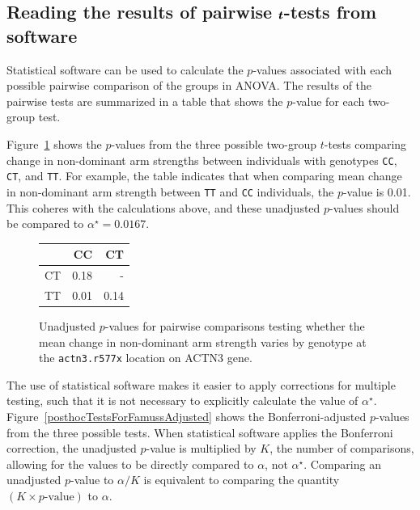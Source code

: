 

\textD{\newpage}


\subsection{Reading the results of pairwise $\pmb{\MakeLowercase{t}}$-tests from software}

Statistical software can be used to calculate the $p$-values associated with each possible pairwise comparison of the groups in ANOVA. The results of the pairwise tests are summarized in a table that shows the $p$-value for each two-group test. 

Figure~\ref{posthocTestsForFamussUnadjusted} shows the $p$-values from the three possible two-group $t$-tests comparing change in non-dominant arm strengths between individuals with genotypes \texttt{CC}, \texttt{CT}, and \texttt{TT}. For example, the table indicates that when comparing mean change in non-dominant arm strength between \texttt{TT} and \texttt{CC} individuals, the $p$-value is 0.01. This coheres with the calculations above, and these unadjusted $p$-values should be compared to $\alpha^\star = 0.0167$.

\begin{figure}[ht]
	\centering
	\begin{tabular}{rrr}
		\hline
		& CC & CT \\ 
		\hline
		CT & 0.18 &  - \\ 
		TT & 0.01 & 0.14 \\ 
		\hline
	\end{tabular}
	\caption{Unadjusted $p$-values for pairwise comparisons testing whether the mean change in non-dominant arm strength varies by genotype at the \texttt{actn3.r577x} location on ACTN3 gene.} 
	\label{posthocTestsForFamussUnadjusted}
\end{figure}

The use of statistical software makes it easier to apply corrections for multiple testing, such that it is not necessary to explicitly calculate the value of $\alpha^\star$. Figure~\ref{posthocTestsForFamussAdjusted} shows the Bonferroni-adjusted $p$-values from the three possible tests. When statistical software applies the Bonferroni correction, the unadjusted $p$-value is multiplied by $K$, the number of comparisons, allowing for the values to be directly compared to $\alpha$, not $\alpha^\star$. Comparing an unadjusted $p$-value to $\alpha/K$ is equivalent to comparing the quantity $(K \times p\text{-value})$ to $\alpha$.

